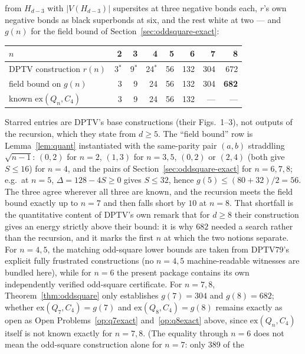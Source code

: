 \documentclass[12pt,a4paper]{article}
\theoremstyle{definition}
\newcommand{\ex}{\mathrm{ex}}
\begin{document}
\begin{enumerate}
    from $H_{d-3}$ with $|V(H_{d-3})|$ supersites at three negative bonds
    each, $r$'s own negative bonds as black superbonds at six, and the rest
    white at two --- and $g(n)$ for the field bound of
    Section~\ref{sec:oddsquare-exact}:
    \begin{center}\small
    \begin{tabular}{lrrrrrrr}
    \toprule
    $n$ & 2 & 3 & 4 & 5 & 6 & 7 & 8\\
    \midrule
    DPTV construction $r(n)$ & 3$^{*}$ & 9$^{*}$ & 24$^{*}$ & 56 & 132 & 304 & 672\\
    field bound on $g(n)$ & 3 & 9 & 24 & 56 & 132 & 304 & \textbf{682}\\
    known $\ex(Q_n,C_4)$ & 3 & 9 & 24 & 56 & 132 & --- & ---\\
    \bottomrule
    \end{tabular}
    \end{center}
    Starred entries are DPTV's base constructions (their Figs.~1--3), not
    outputs of the recursion, which they state from $d\ge5$.
    The ``field bound'' row is Lemma~\ref{lem:quant} instantiated with the
    same-parity pair $(a,b)$ straddling $\sqrt{n-1}$: $(0,2)$ for $n=2$,
    $(1,3)$ for $n=3,5$, $(0,2)$ or $(2,4)$ (both give $S\le16$) for
    $n=4$, and the pairs of Section~\ref{sec:oddsquare-exact} for
    $n=6,7,8$; e.g.\ at $n=5$, $\Delta=128-4S\ge0$ gives $S\le32$, hence
    $g(5)\le(80+32)/2=56$.
    The three agree wherever all three are known, and the recursion meets
    the field bound exactly up to $n=7$ and then falls short by $10$ at
    $n=8$. That shortfall is the quantitative content of DPTV's own remark
    that for $d\ge8$ their construction gives an energy strictly above their
    bound: it is why $682$ needed a search rather than the recursion, and it
    marks the first $n$ at which the two notions separate. For $n=4,5$, the matching odd-square lower
    bounds are taken from DPTV79's explicit fully frustrated constructions
    (no $n=4,5$ machine-readable witnesses are bundled here), while for $n=6$
    the present package contains its own independently verified odd-square
    certificate. For $n=7,8$,
    Theorem~\ref{thm:oddsquare}
    only establishes $g(7)=304$ and $g(8)=682$; whether
    $\ex(Q_7,C_4)=g(7)$ and $\ex(Q_8,C_4)=g(8)$ remains exactly as open
    as Open Problems~\ref{op:q7exact} and~\ref{op:q8exact} above, since
    $\ex(Q_n,C_4)$ itself is not known exactly for $n=7,8$. (The
    equality through $n=6$ does not mean the
    odd-square construction alone for $n=7$: only 389 of the

\end{enumerate}
\end{document}
